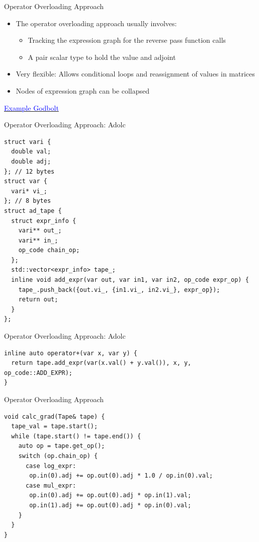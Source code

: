 \documentclass[dvipsnames]{beamer}
\begin{document}
\begin{frame}{Operator Overloading Approach}
\begin{itemize}
    \item The operator overloading approach usually involves:
    \begin{itemize}
        \item Tracking the expression graph for the reverse pass function calls
        \item A pair scalar type to hold the value and adjoint
    \end{itemize}
    \item Very flexible: Allows conditional loops and reassignment of values in matrices
    \item Nodes of expression graph can be collapsed
\end{itemize}
\centerline{\href{https://godbolt.org/z/je173T18Y}{\textcolor{blue}{Example Godbolt}}}
\end{frame}

\begin{frame}[fragile]{Operator Overloading Approach: Adolc}
\begin{verbatim}
struct vari {
  double val;
  double adj;
}; // 12 bytes
struct var {
  vari* vi_;
}; // 8 bytes
struct ad_tape {
  struct expr_info {
    vari** out_;
    vari** in_;
    op_code chain_op;
  };
  std::vector<expr_info> tape_;
  inline void add_expr(var out, var in1, var in2, op_code expr_op) {
    tape_.push_back({out.vi_, {in1.vi_, in2.vi_}, expr_op});
    return out;
  }
};
\end{verbatim}
\end{frame}

\begin{frame}[fragile]{Operator Overloading Approach: Adolc}
\begin{verbatim}
inline auto operator+(var x, var y) {
  return tape.add_expr(var(x.val() + y.val()), x, y, op_code::ADD_EXPR);
}
\end{verbatim}
\end{frame}

\begin{frame}[fragile]{Operator Overloading Approach}
\begin{verbatim}
void calc_grad(Tape& tape) {
  tape_val = tape.start();
  while (tape.start() != tape.end()) {
    auto op = tape.get_op();
    switch (op.chain_op) {
      case log_expr:
       op.in(0).adj += op.out(0).adj * 1.0 / op.in(0).val;
      case mul_expr:
       op.in(0).adj += op.out(0).adj * op.in(1).val;
       op.in(1).adj += op.out(0).adj * op.in(0).val;
    }
  }
}
\end{verbatim}
\end{frame}
\end{document}
